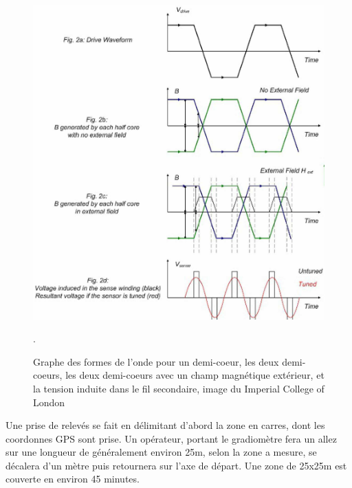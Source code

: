 \documentclass[a4paper, 12pt, titlepage, oneside, french]{article}
\begin{document}
\begin{figure}[H]
	\centering
		\includegraphics[width=\textwidth, height=0.9\textheight, keepaspectratio]{FluxgatePlot.jpg}
		\caption{Graphe des formes de l'onde pour un demi-coeur, les deux demi-coeurs, les deux demi-coeurs avec un champ magnétique extérieur, et la tension induite dans le fil secondaire, image du Imperial College of London}. 
		\label{fig:FluxPlot}
\end{figure}

		Une prise de relevés se fait en délimitant d'abord la zone en carres, dont les coordonnes GPS sont prise. Un opérateur, portant le gradiomètre fera un allez sur une longueur de généralement environ 25m, selon la zone a mesure, se décalera d'un mètre puis retournera sur l'axe de départ. Une zone de 25x25m est couverte en environ 45 minutes.
\end{document}

